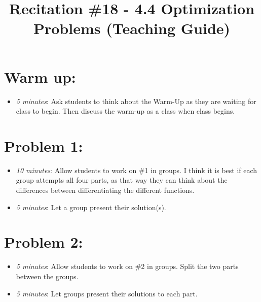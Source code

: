 \documentclass[handout,nooutcomes]{ximera}
\title{Recitation \#18 - 4.4 Optimization Problems (Teaching Guide)}
\begin{document}
\begin{abstract}		\end{abstract}
\maketitle


\section*{Warm up:} 
	
	\begin{itemize}
	
	\item  \emph{5 minutes}:  Ask students to think about the Warm-Up as they are waiting for class to begin.  Then discuss the warm-up as a class when class begins.
	
	
	
	\end{itemize}


\section*{Problem 1:}

	\begin{itemize}
	
	\item  \emph{10 minutes}:  Allow students to work on \#1 in groups.  I think it is best if each group attempts all four parts, as that way they can think about the differences between differentiating the different functions.
	
	\item  \emph{5 minutes}:  Let a group present their solution(s).
	
	\end{itemize}



\section*{Problem 2:}

	\begin{itemize}
	
	\item  \emph{5 minutes}:  Allow students to work on \#2 in groups.  Split the two parts between the groups.
		
	\item  \emph{5 minutes}:  Let groups present their solutions to each part.
			
	\end{itemize}
	
\end{document}
